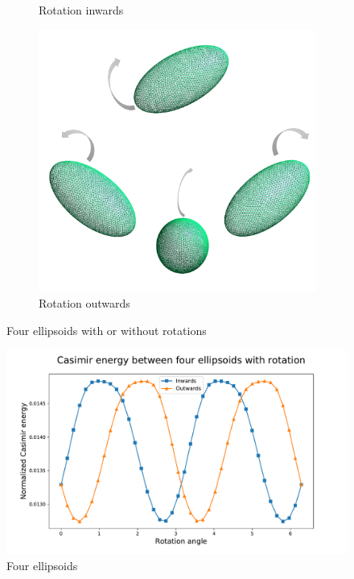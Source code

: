 \begin{figure}[H]
\begin{subfigure}{.5\linewidth}
            \caption{Rotation inwards}
            \label{Rotation inwards 4}
            \end{subfigure}%
            \begin{subfigure}{.5\linewidth}
            \centering
            \includegraphics[scale = 0.4]{figures/4_ellip_out}
            \caption{Rotation outwards}
            \label{Rotation outwards 4}
            \end{subfigure}
            \caption{Four ellipsoids with or without rotations}
            \label{Four ellipsoids with or without rotations}
            \end{figure}

            \begin{figure}[H]
                \includegraphics[scale = 0.7]{figures/CasE_4_ellip.pdf}
                \caption{Four ellipsoids}
                \label{Four ellipsoids}
            \end{figure}


